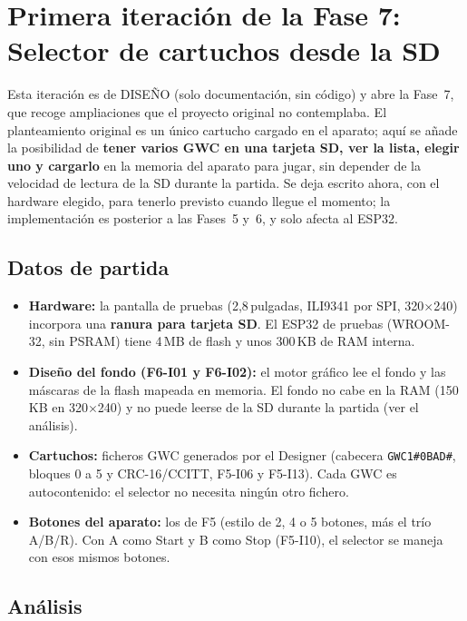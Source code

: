 \section{Primera iteración de la Fase 7: Selector de cartuchos desde la SD}
\label{sec:F7I01}

Esta iteración es de DISEÑO (solo documentación, sin código) y abre la Fase~7, que recoge ampliaciones que el proyecto original no contemplaba. El planteamiento original es un único cartucho cargado en el aparato; aquí se añade la posibilidad de \textbf{tener varios GWC en una tarjeta SD, ver la lista, elegir uno y cargarlo} en la memoria del aparato para jugar, sin depender de la velocidad de lectura de la SD durante la partida. Se deja escrito ahora, con el hardware elegido, para tenerlo previsto cuando llegue el momento; la implementación es posterior a las Fases~5 y~6, y solo afecta al ESP32.

\subsection{Datos de partida}
\label{sec:F7I01Datos}

\begin{itemize}
	\item \textbf{Hardware:} la pantalla de pruebas (2,8\,pulgadas, ILI9341 por SPI, 320$\times$240) incorpora una \textbf{ranura para tarjeta SD}. El ESP32 de pruebas (WROOM-32, sin PSRAM) tiene 4\,MB de flash y unos 300\,KB de RAM interna.
	\item \textbf{Diseño del fondo (F6-I01 y F6-I02):} el motor gráfico lee el fondo y las máscaras de la flash mapeada en memoria. El fondo no cabe en la RAM (150\,KB en 320$\times$240) y no puede leerse de la SD durante la partida (ver el análisis).
	\item \textbf{Cartuchos:} ficheros GWC generados por el Designer (cabecera \texttt{GWC1\#0BAD\#}, bloques 0 a 5 y CRC-16/CCITT, F5-I06 y F5-I13). Cada GWC es autocontenido: el selector no necesita ningún otro fichero.
	\item \textbf{Botones del aparato:} los de F5 (estilo de 2, 4 o 5 botones, más el trío A/B/R). Con A como Start y B como Stop (F5-I10), el selector se maneja con esos mismos botones.
\end{itemize}

\subsection{Análisis}
\label{sec:F7I01Analisis}

